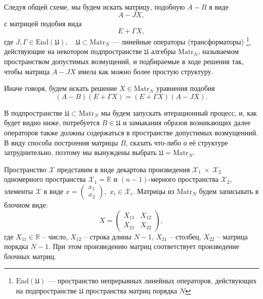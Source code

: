 Следуя общей схеме, мы будем искать матрицу, подобную \( A - B \)
в виде
\[ A - J X, \]
с матрицей подобия вида
\[ E + \Gamma X ,\]
где
\( J, \Gamma \in \mathrm{End}\left(\mathfrak U\right),\quad \mathfrak{U}\subset\mathrm{Matr}_{N} \)
--- линейные операторы (трансформаторы)
\footnote{\( \mathrm{End}\left(\mathfrak U\right) \) --- пространство непрерывных линейных операторов,
действующих на подпространстве \( \mathfrak U \) пространства матриц порядка \( N \)},
действующие на некотором подпространстве \( \mathfrak U \) алгебры \( \mathrm{Matr}_{N} \),
называемом пространством допустимых возмущений,
и подбираемые в ходе решения так, чтобы матрица \( A - JX \)
имела как можно более простую структуру.

Иначе говоря, будем искать решение \( X \in\mathrm{Matr}_{N} \)
уравнения подобия
\begin{equation}\label{eq:similarity-orig}
    (A - B)(E+\Gamma X) = (E+\Gamma X) (A - JX).
\end{equation}

В подпространстве \( \mathfrak U \subset \mathrm{Matr}_{N} \)
мы будем запускать итерационный процесс,
и, как будет видно ниже, потребуется \( B \in \mathfrak U \)
и замыкания образов возникающих далее операторов также
должны содержаться в
пространстве допустимых возмущенний.
В виду способа построения матрицы \( B \), сказать что-либо о её структуре затруднительно,
поэтому мы вынуждены выбрать \( \mathfrak U = \mathrm{Matr}_{N}\).

Пространство \( \mathscr{X} \) представим в виде
декартова произведения
\( \mathscr{X}_1~\times~\mathscr{X}_2 \)
одномерного пространства \( \mathscr{X}_1=\mathbb{R} \)
и \((n-1)\)-мерного пространства \( \mathscr{X}_2 \),
элементы \( \mathscr{X} \) в виде
\( x=\begin{pmatrix}x_1\\x_2\end{pmatrix}, \)
\( x_i\in\mathscr{X}_i \).
Матрицы из \( \mathrm{Matr}_{N} \) будем записывать
в блочном виде:
\[
    X = \begin{pmatrix}
    X_{11} & X_{12} \\
    X_{21} & X_{22}
    \end{pmatrix},
    \]
где \( { X_{11}\in\mathbb{R} } \) -- число,
    \( X_{12} \) -- строка длины \( N-1 \),
    \( X_{21} \) -- столбец,
    \( X_{22} \) -- матрица порядка \( N-1 \).
При этом произведению матриц соответствует произведение блочных матриц.

